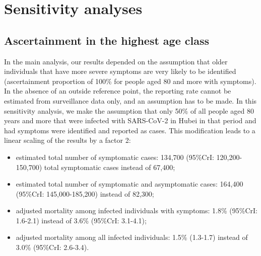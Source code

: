 \documentclass{article}
\begin{document}
\clearpage
\section{Sensitivity analyses}
\label{sst}

\subsection{Ascertainment in the highest age class}
	
	In the main analysis, our results depended on the assumption that older individuals that have more severe symptoms are very likely to be identified (ascertainment proportion of 100\% for people aged 80 and more with symptoms). 
	In the absence of an outside reference point, the reporting rate cannot be estimated from surveillance data only, and an assumption has to be made.
	In this sensitivity analysis, we make the assumption that only 50\% of all people aged 80 years and more that were infected with SARS-CoV-2 in Hubei in that period and had symptoms were identified and reported as cases.
	This modification leads to a linear scaling of the results by a factor 2: 
	\begin{itemize}
		\item estimated total number of symptomatic cases: 134,700 (95\%CrI: 120,200-150,700) total symptomatic cases instead of 67,400;
		\item estimated total number of symptomatic and asymptomatic cases: 164,400 (95\%CrI: 145,000-185,200) instead of 82,300;
		\item adjusted mortality among infected individuals with symptoms: 1.8\% (95\%CrI: 1.6-2.1) instead of 3.6\% (95\%CrI: 3.1-4.1);
		\item adjusted mortality among all infected individuals: 1.5\% (1.3-1.7) instead of 3.0\% (95\%CrI: 2.6-3.4).
	\end{itemize}
	
	
\end{document}
